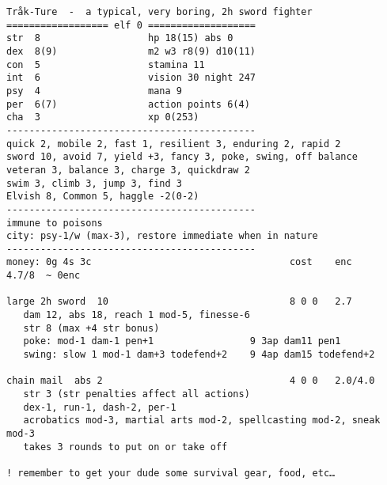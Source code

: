 \small \begin{verbatim}
Tråk-Ture  -  a typical, very boring, 2h sword fighter
================== elf 0 ===================
str  8                   hp 18(15) abs 0
dex  8(9)                m2 w3 r8(9) d10(11)
con  5                   stamina 11
int  6                   vision 30 night 247
psy  4                   mana 9
per  6(7)                action points 6(4)
cha  3                   xp 0(253)
--------------------------------------------
quick 2, mobile 2, fast 1, resilient 3, enduring 2, rapid 2
sword 10, avoid 7, yield +3, fancy 3, poke, swing, off balance
veteran 3, balance 3, charge 3, quickdraw 2
swim 3, climb 3, jump 3, find 3
Elvish 8, Common 5, haggle -2(0-2)
--------------------------------------------
immune to poisons
city: psy-1/w (max-3), restore immediate when in nature
--------------------------------------------
money: 0g 4s 3c                                   cost    enc      4.7/8  ~ 0enc

large 2h sword  10                                8 0 0   2.7
   dam 12, abs 18, reach 1 mod-5, finesse-6
   str 8 (max +4 str bonus)
   poke: mod-1 dam-1 pen+1                 9 3ap dam11 pen1
   swing: slow 1 mod-1 dam+3 todefend+2    9 4ap dam15 todefend+2

chain mail  abs 2                                 4 0 0   2.0/4.0
   str 3 (str penalties affect all actions)
   dex-1, run-1, dash-2, per-1
   acrobatics mod-3, martial arts mod-2, spellcasting mod-2, sneak mod-3
   takes 3 rounds to put on or take off

! remember to get your dude some survival gear, food, etc…
\end{verbatim} \normalsize








%






